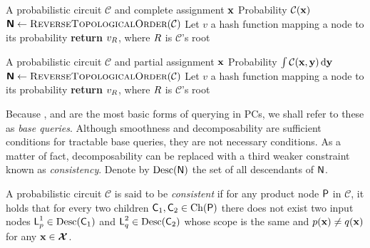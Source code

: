 \begin{algorithm}[t]
  \caption{\evi}\label{alg:evi}
  \begin{algorithmic}[1]
    \Require A probabilistic circuit $\mathcal{C}$ and complete assignment $\mathbf{x}$
    \Ensure Probability $\mathcal{C}(\mathbf{x})$
    \State $\Nodes\gets\textproc{ReverseTopologicalOrder}(\mathcal{C})$
    \State Let $v$ a hash function mapping a node to its probability
    \EndFor%
    \State \textbf{return} $v_{\normalfont{R}}$, where $\normalfont{R}$ is $\mathcal{C}$'s root
  \end{algorithmic}
\end{algorithm}

\begin{algorithm}[t]
  \caption{\mar}\label{alg:mar}
  \begin{algorithmic}[1]
    \Require A probabilistic circuit $\mathcal{C}$ and partial assignment $\mathbf{x}$
    \Ensure Probability $\int\mathcal{C}(\mathbf{x},\mathbf{y})\mathop{}\!\mathrm{d}\mathbf{y}$
    \State $\Nodes\gets\textproc{ReverseTopologicalOrder}(\mathcal{C})$
    \State Let $v$ a hash function mapping a node to its probability
    \EndFor%
    \State \textbf{return} $v_{\normalfont{R}}$, where $\normalfont{R}$ is $\mathcal{C}$'s root
  \end{algorithmic}
\end{algorithm}

Because \evi{}, \mar{} and \con{} are the most basic forms of querying in PCs, we shall refer to
these as \emph{base queries}. Although smoothness and decomposability are sufficient conditions for
tractable base queries, they are not necessary conditions. As a matter of fact, decomposability can
be replaced with a third weaker constraint known as \emph{consistency}. Denote by $\operatorname*{\normalfont{Desc}}(\operatorname{\textsf{N}})$
the set of all descendants of $\operatorname{\textsf{N}}$.

\begin{definition}[Consistency]
  A probabilistic circuit $\mathcal{C}$ is said to be \emph{consistent} if for any product node
  $\operatorname{\textsf{P}}$ in $\mathcal{C}$, it holds that for every two children $\operatorname{\textsf{C}}_1,\operatorname{\textsf{C}}_2\in\operatorname*{\normalfont{Ch}}(\operatorname{\textsf{P}})$
  there does not exist two input nodes $\operatorname{\textsf{L}}_p^1\in\operatorname*{\normalfont{Desc}}(\operatorname{\textsf{C}}_1)$ and
  $\operatorname{\textsf{L}}_q^2\in\operatorname*{\normalfont{Desc}}(\operatorname{\textsf{C}}_2)$ whose scope is the same and $p(\mathbf{x})\neq q(\mathbf{x})$ for any
  $\mathbf{x}\in\bm{\mathcal{X}}$.
\end{definition}

